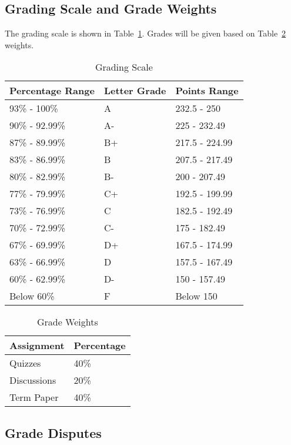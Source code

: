 \documentclass[12pt, letterpaper]{article}
\begin{document}
\subsection*{Grading Scale and Grade Weights}  
The grading scale is shown in Table~\ref{tab:grading-scale}. Grades will be given based on Table~\ref{tab:grade-weights} weights.

\begin{table}[ht]
\centering
\caption{Grading Scale}
\begin{tabular}{lll}
\toprule
\textbf{Percentage Range} & \textbf{Letter Grade} & \textbf{Points Range} \\
\midrule
93\% - 100\% & A & 232.5 - 250 \\
90\% - 92.99\% & A- & 225 - 232.49 \\
87\% - 89.99\% & B+ & 217.5 - 224.99 \\
83\% - 86.99\% & B & 207.5 - 217.49 \\
80\% - 82.99\% & B- & 200 - 207.49 \\
77\% - 79.99\% & C+ & 192.5 - 199.99 \\
73\% - 76.99\% & C & 182.5 - 192.49 \\
70\% - 72.99\% & C- & 175 - 182.49 \\
67\% - 69.99\% & D+ & 167.5 - 174.99 \\
63\% - 66.99\% & D & 157.5 - 167.49 \\
60\% - 62.99\% & D- & 150 - 157.49 \\
Below 60\% & F & Below 150 \\
\bottomrule
\end{tabular}
\label{tab:grading-scale}
\end{table}

\begin{table}[ht]
    \centering
    \caption{Grade Weights}
    \begin{tabular}{ll}
        \toprule
    \textbf{Assignment} & \textbf{Percentage} \\
    \midrule
    Quizzes & 40\% \\
    Discussions & 20\% \\
    Term Paper & 40\% \\
    \bottomrule
    \end{tabular}
    \label{tab:grade-weights}
    \end{table}

\subsection*{Grade Disputes}
\end{document}
